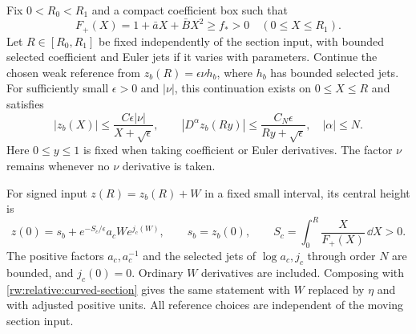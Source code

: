 \begin{proposition}
\label{rw:transitions:central-core}
Fix $0<R_0<R_1$ and a compact coefficient box such that
\[
 F_+(X)=1+\bar aX+\bar BX^2\ge f_*>0
 \quad(0\le X\le R_1).
\]
Let $R\in[R_0,R_1]$ be fixed independently of the section input, with
bounded selected coefficient and Euler jets if it varies with parameters.
Continue the chosen weak reference from
$z_b(R)=\epsilon\nu h_b$, where $h_b$ has bounded selected jets.
For sufficiently small $\epsilon>0$ and $|\nu|$, this continuation
exists on $0\le X\le R$ and satisfies
\begin{equation}\label{rw:relative:reference-weight}
 |z_b(X)|\le\frac{C\epsilon|\nu|}{X+\sqrt\epsilon},\qquad
 |D^\alpha z_b(Ry)|\le
       \frac{C_N\epsilon}{Ry+\sqrt\epsilon},\quad |\alpha|\le N.
\end{equation}
Here $0\le y\le1$ is fixed when taking coefficient or Euler
derivatives. The factor $\nu$ remains whenever no $\nu$ derivative
is taken.

For signed input $z(R)=z_b(R)+W$ in a fixed small interval, its
central height is
\begin{equation}\label{rw:relative:central-output}
 z(0)=s_b+e^{-S_c/\epsilon}a_cW e^{j_c(W)},\qquad
 s_b=z_b(0),\qquad S_c=\int_0^R\frac{X}{F_+(X)}\,\dd X>0.
\end{equation}
The positive factors $a_c,a_c^{-1}$ and the selected jets of
$\log a_c,j_c$ through order $N$ are bounded, and $j_c(0)=0$.
Ordinary $W$ derivatives are included. Composing with
\eqref{rw:relative:curved-section} gives the same statement with
$W$ replaced by $\eta$ and with adjusted positive units.
All reference choices are independent of the moving section input.
\end{proposition}

